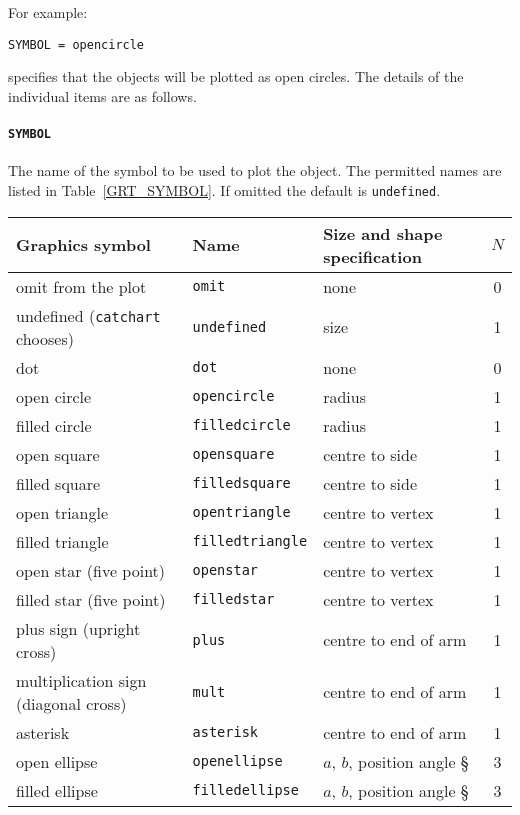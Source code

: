 \documentclass[twoside,11pt]{article}
\renewcommand{\_}{\texttt{\symbol{95}}}
\begin{document}
For example:

\begin{center}
{\tt SYMBOL~=~opencircle}
\end{center}

specifies that the objects will be plotted as open circles.  The details of
the individual items are as follows.

\paragraph{{\tt SYMBOL}} The name of the symbol to be used to plot
the object.  The permitted names are listed in Table~\ref{GRT_SYMBOL}.
If omitted the default is {\tt undefined}.

\begin{table}[htbp]

\begin{center}
\begin{tabular}{lllc}
Graphics symbol          & Name      & Size and shape specification & $N$ \\ \hline
omit from the plot       & {\tt omit}           &  none             & 0 \\
undefined ({\tt catchart} chooses)    & {\tt undefined}    &  size  & 1 \\
dot                      & {\tt dot}            &  none             & 0 \\
open circle              & {\tt opencircle}     &  radius           & 1 \\
filled circle            & {\tt filledcircle}   &  radius           & 1 \\
open square              & {\tt opensquare}     &  centre to side   & 1 \\
filled square            & {\tt filledsquare}   &  centre to side   & 1 \\
open triangle            & {\tt opentriangle}   &  centre to vertex & 1 \\
filled triangle          & {\tt filledtriangle} &  centre to vertex & 1 \\
open star (five point)   & {\tt openstar}   &  centre to vertex     & 1 \\
filled star (five point) & {\tt filledstar} &  centre to vertex     & 1 \\
plus sign (upright cross) & {\tt plus}      &  centre to end of arm & 1 \\
multiplication sign (diagonal cross) & {\tt mult} &  centre to end of arm & 1 \\
asterisk                 & {\tt asterisk}   &  centre to end of arm & 1 \\
open ellipse             & {\tt openellipse}   & $a$, $b$, position angle \S & 3 \\
filled ellipse           & {\tt filledellipse} & $a$, $b$, position angle \S & 3 \\


\end{tabular}
\end{center}
\end{table}
\end{document}
